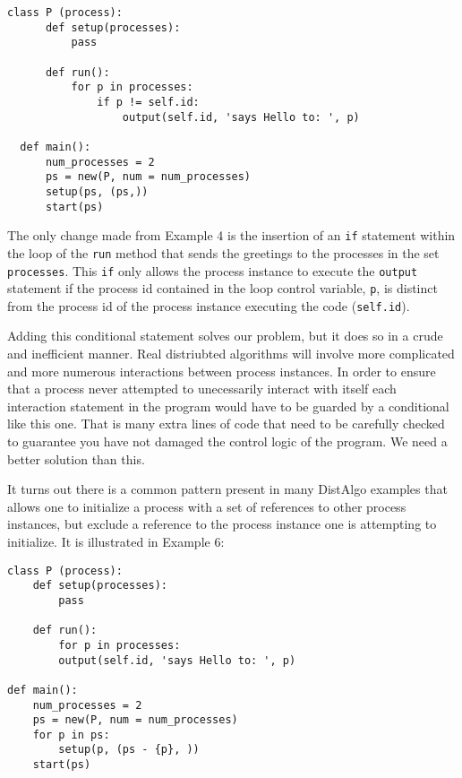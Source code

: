 \documentclass[11pt]{article}
\begin{document}
\begin{lstlisting}[caption={hello\_world05.da - Excluding Self-References, the Ugly Way}, label={lst:hw05}]
  class P (process):
      def setup(processes):
          pass

      def run():
          for p in processes:
              if p != self.id:
                  output(self.id, 'says Hello to: ', p)

  def main():
      num_processes = 2
      ps = new(P, num = num_processes)
      setup(ps, (ps,))
      start(ps)
\end{lstlisting}

\noindent The only change made from Example 4 is the insertion of an \texttt{if}
statement within the loop of the \texttt{run} method that sends the greetings
to the processes in the set \texttt{processes}. This \texttt{if} only allows
the process instance to execute the \texttt{output} statement if the process id
contained in the loop control variable, \texttt{p}, is distinct from the
process id of the process instance executing the code (\texttt{self.id}).

Adding this conditional statement solves our problem, but it does so in a crude
and inefficient manner. Real distriubted algorithms will involve more
complicated and more numerous interactions between process instances. In order
to ensure that a process never attempted to unecessarily interact with itself
each interaction statement in the program would have to be guarded by a
conditional like this one. That is many extra lines of code that need to be
carefully checked to guarantee you have not damaged the control logic of the
program. We need a better solution than this.

It turns out there is a common pattern present in many DistAlgo examples that
allows one to initialize a process with a set of references to other process
instances, but exclude a reference to the process instance one is attempting to
initialize. It is illustrated in Example 6:

\begin{lstlisting}[caption={hello\_world06.da - Excluding Self-References, the Nice Way}, label={lst:hw06}]
class P (process):
    def setup(processes):
        pass

    def run():
        for p in processes:
        output(self.id, 'says Hello to: ', p)

def main():
    num_processes = 2
    ps = new(P, num = num_processes)
    for p in ps:
        setup(p, (ps - {p}, ))
    start(ps)
\end{lstlisting}
\end{document}
